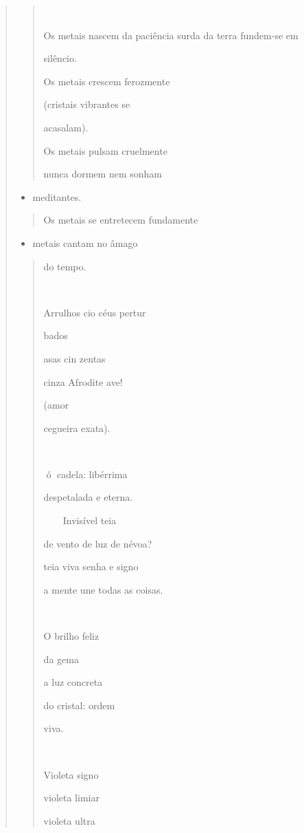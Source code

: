 \begin{verse}
\begin{quote}


Os metais nascem da paciência surda da terra fundem-se em

silêncio.

Os metais crescem ferozmente

(cristais vibrantes se

acasalam).

Os metais pulsam cruelmente

nunca dormem nem sonham
\end{quote}

\begin{itemize}
\item
  meditantes.
\end{itemize}

\begin{quote}
Os metais se entretecem fundamente
\end{quote}

\begin{itemize}
\item
  metais cantam no âmago
\end{itemize}

\begin{quote}
do tempo.



Arrulhos cio céus pertur

bados

asas cin zentas

cinza Afrodite ave!

(amor

cegueira exata).

 

ó cadela: libérrima

despetalada e eterna.

 Invisível teia

de vento de luz de névoa?

teia viva senha e signo

a mente une todas as coisas.



O brilho feliz

da gema

a luz concreta

do cristal: ordem

viva.



Violeta signo

violeta limiar

violeta ultra


\end{quote}
\end{verse}
